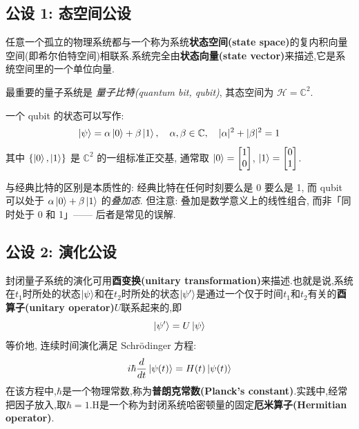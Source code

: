 \documentclass[utf8]{article} %
\numberwithin{equation}{section}   %
\newtheorem{Thm}{\hskip 2em {\color{blue} 定理}}[subsection]
\newtheorem{Eg}{\hskip 2em {\color{black} 例}}[subsection]
\begin{document}
\subsection{公设 1: 态空间公设}

\begin{Thm}
    任意一个孤立的物理系统都与一个称为系统\textbf{状态空间(state space)}的复内积向量空间(即希尔伯特空间)相联系.系统完全由\textbf{状态向量(state vector)}来描述,它是系统空间里的一个单位向量.
\end{Thm}

最重要的量子系统是 \emph{量子比特(quantum bit, qubit)}, 其态空间为 $\mathcal{H} = \mathbb{C}^2$.

\begin{Eg}[qubit]
    一个 qubit 的状态可以写作: 
    \begin{equation*}
        \ket{\psi} = \alpha\ket{0} + \beta\ket{1},
        \quad \alpha, \beta \in \mathbb{C},\quad |\alpha|^2 + |\beta|^2 = 1
    \end{equation*}
    其中 $\{\ket{0}, \ket{1}\}$ 是 $\mathbb{C}^2$ 的一组标准正交基, 
    通常取 $\ket{0} = \begin{bmatrix}1\\0\end{bmatrix}$, $\ket{1} = \begin{bmatrix}0\\1\end{bmatrix}$.
\end{Eg}

与经典比特的区别是本质性的: 经典比特在任何时刻要么是 0 要么是 1, 
而 qubit 可以处于 $\alpha\ket{0} + \beta\ket{1}$ 的\emph{叠加态}.
但注意: 叠加是数学意义上的线性组合, 而非「同时处于 0 和 1」—— 后者是常见的误解.

\subsection{公设 2: 演化公设}

\begin{Thm}
    封闭量子系统的演化可用\textbf{酉变换(unitary transformation)}来描述.也就是说,系统在$t_1$时所处的状态$\ket{\psi}$和在$t_2$时所处的状态$\ket{\psi'}$是通过一个仅于时间$t_1$和$t_2$有关的\textbf{酉算子(unitary operator)}$U$联系起来的,即
	\begin{equation}
        \ket{\psi'}=U\ket{\psi}
    \end{equation}
    等价地, 连续时间演化满足 Schrödinger 方程: 
    \begin{equation}
        i\hbar \frac{d}{dt} \ket{\psi(t)} = H(t) \ket{\psi(t)}
    \end{equation}
    在该方程中,$\hbar$是一个物理常数,称为\textbf{普朗克常数(Planck's constant)}.实践中,经常把因子放入,取$\hbar=1$.H是一个称为封闭系统哈密顿量的固定\textbf{厄米算子(Hermitian operator)}.
\end{Thm}
\end{document}

